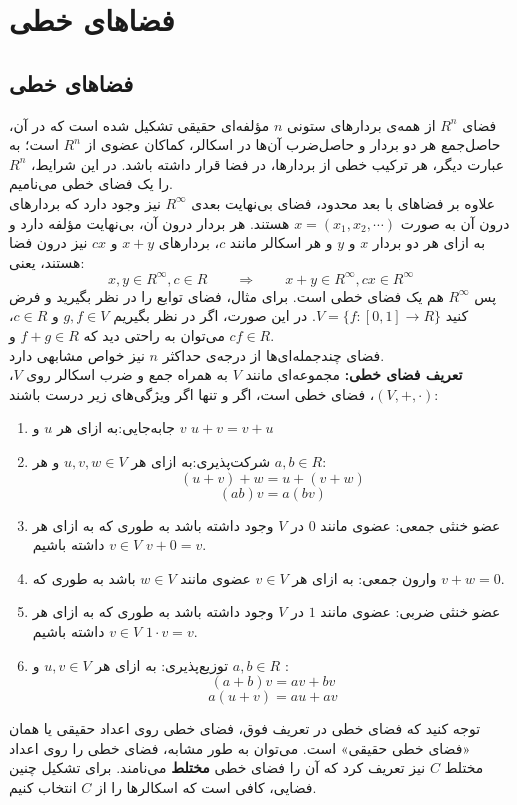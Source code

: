 \chapter{فضاهای خطی}

\section{فضا‌های خطی}
فضا‌ی $R^n$ از همه‌ی بردار‌های ستونی $n$ مؤلفه‌ای حقیقی تشکیل شده است که در آن، حاصل‌جمع هر دو بردار و حاصل‌ضرب آن‌ها در اسکالر، کماکان عضوی از $R^n$ است؛ به عبارت دیگر، هر ترکیب خطی از بردارها، در فضا قرار داشته باشد. در این شرایط،  $R^n$ را یک فضا‌ی خطی می‌نامیم.\\
علاوه بر فضاهای با بعد محدود، فضا‌ی بی‌نهایت بعدی $R^\infty$ نیز وجود دارد که بردار‌های درون آن به صورت $x = (x_1,x_2,\cdots)$ هستند. هر بردار درون آن، بی‌نهایت مؤلفه دارد و به ازای هر دو بردار $x$ و $y$ و هر اسکالر مانند $c$، بردارهای $x+y$ و $cx$ نیز درون فضا هستند، یعنی:
$$x,y\in R^\infty, c\in R \qquad\Rightarrow \qquad x+y\in R^\infty, cx\in R^\infty$$
پس $R^\infty$ هم یک فضای خطی است. برای مثال، فضا‌ی توابع را در نظر بگیرید و فرض کنید $V = \{f:[0,1]\rightarrow{}R\}$. در این صورت، اگر در نظر بگیریم $g,f\in V$  و $c\in R$، می‌توان به راحتی دید که $f+g\in R$ و $cf\in R$.\\ فضا‌ی چند‌جمله‌ای‌ها از درجه‌ی حداکثر $n$ نیز خواص مشابهی دارد.\\
\textbf{تعریف فضا‌ی خطی:}
مجموعه‌ای مانند $V$ به همراه جمع و ضرب اسکالر روی $V$، $(V,+,\cdot)$، فضا‌ی خطی است، اگر و تنها اگر ویژگی‌های زیر درست باشند:\\
\begin{enumerate}
	\item جا‌به‌جایی:\quad به ازای هر $u$ و $v$ \qquad $u+v = v+u$
	\item شرکت‌پذیری:\quad به ازای هر $u,v,w\in V$ و هر $a,b\in R$:
	$$(u+v)+w = u+(v+w)$$
	$$(ab)v=a(bv)$$
	\item عضو خنثی جمعی:  عضوی مانند $0$ در $V$ وجود داشته باشد به طوری که به ازای هر $v\in V$ داشته باشیم $v+0=v$.
	\item وارون جمعی: به ازای هر $v\in V$ عضوی مانند $w\in V$ باشد به طوری که $v+w=0$.
	\item عضو خنثی ضربی: عضوی مانند $1$ در $V$ وجود داشته باشد به طوری که به ازای هر $v\in V$ داشته باشیم $1\cdot v = v$.
	\item توزیع‌پذیری: به ازای هر $u,v\in V$ و $a,b\in R$ :
	$$(a+b)v = av + bv$$
	$$a(u+v) = au+av$$
\end{enumerate}
توجه کنید که فضا‌ی خطی در تعریف فوق، فضا‌ی خطی روی اعداد حقیقی یا همان «فضا‌ی خطی حقیقی» است. می‌توان به طور مشابه، فضا‌ی خطی را روی اعداد مختلط $C$ نیز تعریف کرد که آن را فضا‌ی خطی \textbf{مختلط} می‌نامند. برای تشکیل چنین فضایی، کافی است که اسکالر‌ها را از $C$ انتخاب کنیم.\\
